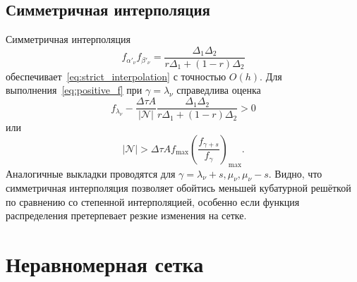 \documentclass[a4paper,12pt]{article}
\newcommand{\Nu}{\mathcal{N}}
\newcommand{\OO}[1]{O(#1)}
\begin{document}
\subsection{Симметричная интерполяция}

Симметричная интерполяция
\begin{equation}\label{eq:uniform_spm}
    f_{\alpha'_\nu}f_{\beta'_\nu} = \frac{\Delta_1\Delta_2}{r\Delta_1+(1-r)\Delta_2}
\end{equation}
обеспечивает~\eqref{eq:strict_interpolation} с точностью \(\OO{h}\).
Для выполнения~\eqref{eq:positive_f} при \(\gamma = \lambda_\nu\) справедлива оценка
\begin{equation}\label{eq:positive_f_lambda_uniform_spm}
   f_{\lambda_\nu} - \frac{\Delta\tau A}{|\Nu|} \frac{\Delta_1\Delta_2}{r\Delta_1+(1-r)\Delta_2} > 0
\end{equation}
или
\begin{equation}\label{eq:positive_f_lambda_uniform_spm2}
   |\Nu| > \Delta\tau A f_{\max} \left(\frac{f_{\gamma+s}}{f_\gamma}\right)_{\max}.
\end{equation}
Аналогичные выкладки проводятся для \(\gamma = \lambda_\nu+s, \mu_\nu, \mu_\nu-s\).
Видно, что симметричная интерполяция позволяет обойтись меньшей кубатурной решёткой
по сравнению со степенной интерполяцией, особенно если функция распределения претерпевает
резкие изменения на сетке.

\section{Неравномерная сетка}
\end{document}
